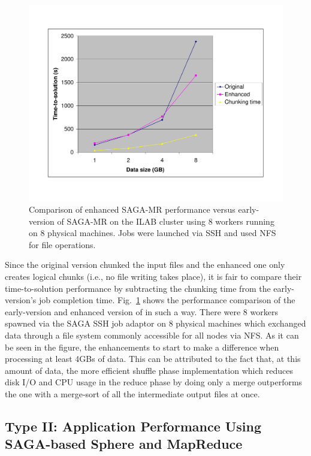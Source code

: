 \documentclass[3p,twocolumn]{elsarticle}
\begin{document}
\begin{figure}[htb!]
 \includegraphics[scale=0.3]{sagamr_original_vs_enhanced.pdf}
 \caption{Comparison of enhanced SAGA-MR performance versus
   early-version of SAGA-MR on the ILAB cluster using 8 workers running on 8
   physical machines. Jobs were launched via SSH and used NFS for file
   operations.}
 \label{sagamr_comparison}
\end{figure}

Since the original \sagamapreduce version chunked the input files and
the enhanced one only creates logical chunks (i.e., no file writing takes
place), it is fair to compare their time-to-solution performance by subtracting
the chunking time from the early-version's job completion time.
Fig.~\ref{sagamr_comparison} shows the performance comparison of the early-version and
enhanced version of \sagamapreduce in such a way.
There were 8 workers spawned via the SAGA SSH job adaptor on 8 physical
machines which exchanged data through a file system commonly accessible for all
nodes via NFS. As it can be seen in the figure, the enhancements to \sagamapreduce
start to make a difference when processing at least 4GBs of data.
This can be attributed to the fact that, at this amount of data, the
more efficient shuffle phase implementation which reduces disk I/O and CPU
usage in the reduce phase by doing only a merge outperforms the one with
a merge-sort of all the intermediate output files at once.

\subsection{Type II: Application Performance Using SAGA-based Sphere
  and MapReduce}
\end{document}
